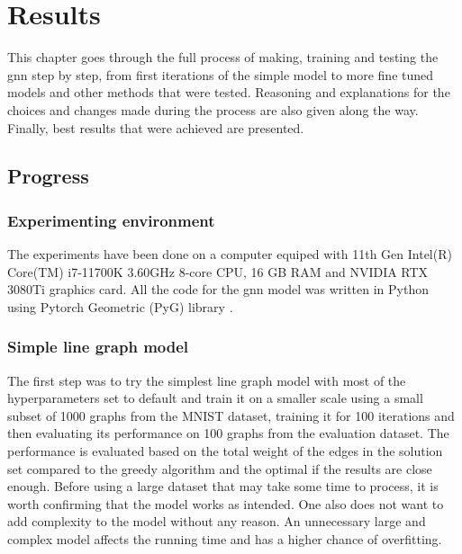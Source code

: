 \chapter{Results}

This chapter goes through the full process of making, training and testing the \gls{gnn} step by step, from first iterations of the simple model to more fine tuned models and other methods that were tested. Reasoning and explanations for the choices and changes made during the process are also given along the way. Finally, best results that were achieved are presented. 

\section{Progress}

\subsection{Experimenting environment}

The experiments have been done on a computer equiped with 11th Gen Intel(R) Core(TM) i7-11700K 3.60GHz 8-core CPU, 16 GB RAM and NVIDIA RTX 3080Ti graphics card. All the code for the \gls{gnn} model was written in Python using Pytorch Geometric (PyG) library \cite{pytorchlib}.

\subsection{Simple line graph model}

The first step was to try the simplest line graph model with most of the hyperparameters set to default and train it on a smaller scale using a small subset of 1000 graphs from the MNIST dataset, training it for 100 iterations and then evaluating its performance on 100 graphs from the evaluation dataset. The performance is evaluated based on the total weight of the edges in the solution set compared to the greedy algorithm and the optimal if the results are close enough. Before using a large dataset that may take some time to process, it is worth confirming that the model works as intended. One also does not want to add complexity to the model without any reason. An unnecessary large and complex model affects the running time and has a higher chance of overfitting. 

